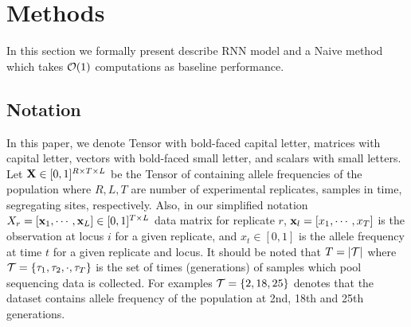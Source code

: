 \section{Methods}
In this section we formally present describe RNN model and a Naive method which takes ${\cal O}(1)$ computations as baseline performance.

\subsection{Notation}
In this paper, we denote Tensor with bold-faced capital letter, matrices with capital letter, vectors with bold-faced small letter, and scalars with small letters. Let ${\mathbf X} \in [0,1]^{R \times T \times L}$  be the Tensor of containing allele frequencies of the population where $R,L,T$ are number of experimental replicates, samples in time, segregating sites, respectively. Also, in our simplified notation $X_r=[{\mathbf x}_1 ,\cdots, {\mathbf x}_L]\in  [0,1]^ {T \times L}$  data matrix for replicate $r$,  ${\mathbf x}_l =[x_1,\cdots,x_T]$ is the observation at locus $i$ for a given replicate, and $x_t\in [0,1]$ is the allele frequency at time $t$ for a given replicate and locus. It should be noted that $T=|{\cal T}|$ where ${\cal T}=\{\tau_1,\tau_2,\cdot, \tau_T \}$ is the set of times (generations) of samples which pool sequencing data is collected. For examples ${\cal T}=\{2,18,25\}$ denotes that the dataset contains allele frequency of the population at 2nd, 18th and 25th generations.



